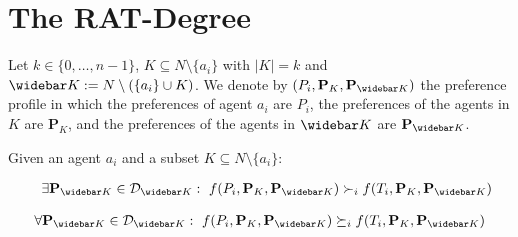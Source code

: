 \section{The RAT-Degree}\label{sec:RAT-degree}


\newcommand{\prefsOf}[1]{\mathbf{P}_{#1}}
\newcommand{\domainsOf}[1]{\mathbf{D}_{#1}}

Let $k \in \{0,\ldots, n-1\}$, $K \subseteq N \setminus \{a_i\}$ with $|K| = k$ and $\notK := N \setminus (\{a_i\} \cup K)$.
We denote by $(P_i, \prefsOf{K}, \prefsOf{\notK})$ the preference profile in which the preferences of agent $a_i$ are $P_i$, the preferences of the agents in $K$ are $\prefsOf{K}$, and the preferences of the agents in $\notK$ are $\prefsOf{\notK}$.


\begin{definition}
\label{def:given-K}
Given an agent $a_i$ and a subset $K\subseteq N\setminus \{a_i\}$:

    \begin{align}
    \label{eq:k-manipulation}
            \quad \exists \prefsOf{\notK}
            \in \domain_{\notK}
            :~ f(P_i,\prefsOf{K}, \prefsOf{\notK}) \succ_i f(T_i,\prefsOf{K}, \prefsOf{\notK})
    \end{align}

    \begin{align}
    \label{eq:k-safe-manipulation}
            \forall \prefsOf{\notK}
            \in \domain_{\notK}
            :~ f(P_i,\prefsOf{K}, \prefsOf{\notK}) \succeq_i f(T_i,\prefsOf{K}, \prefsOf{\notK})
    \end{align}
\end{definition}


